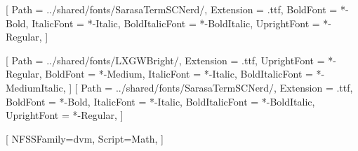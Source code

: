 \setmonofont{SarasaTermSCNerd}[
    Path = ../shared/fonts/SarasaTermSCNerd/,
    Extension = .ttf,
    BoldFont = *-Bold,
    ItalicFont = *-Italic,
    BoldItalicFont = *-BoldItalic,
    UprightFont = *-Regular,
]

\usepackage{xeCJK}
[
    Path = ../shared/fonts/LXGWBright/,
    Extension = .ttf,
    UprightFont = *-Regular,
    BoldFont = *-Medium,
    ItalicFont = *-Italic,
    BoldItalicFont = *-MediumItalic,
]
[
    Path = ../shared/fonts/SarasaTermSCNerd/,
    Extension = .ttf,
    BoldFont = *-Bold,
    ItalicFont = *-Italic,
    BoldItalicFont = *-BoldItalic,
    UprightFont = *-Regular,
]


[
  NFSSFamily=dvm,
  Script=Math, %
]
\AtBeginDocument{%
  \renewcommand{\widehat}{\Umathaccent 7 \symdvm "00302\relax}%
  \renewcommand{\widetilde}{\Umathaccent 7 \symdvm "00303\relax}%
}